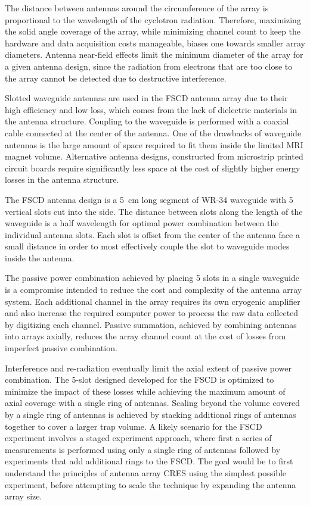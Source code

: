 The distance between antennas around the circumference of the array is proportional to the wavelength of the cyclotron radiation. Therefore, maximizing the solid angle coverage of the array, while minimizing channel count to keep the hardware and data acquisition costs manageable, biases one towards smaller array diameters. Antenna near-field effects limit the minimum diameter of the array for a given antenna design, since the radiation from electrons that are too close to the array cannot be detected due to destructive interference. 

Slotted waveguide antennas are used in the FSCD antenna array due to their high efficiency and low loss, which comes from the lack of dielectric materials in the antenna structure. Coupling to the waveguide is performed with a coaxial cable connected at the center of the antenna. One of the drawbacks of waveguide antennas is the large amount of space required to fit them inside the limited MRI magnet volume. Alternative antenna designs, constructed from microstrip printed circuit boards require significantly less space at the cost of slightly higher energy losses in the antenna structure. 

The FSCD antenna design is a 5~cm long segment of WR-34 waveguide with 5 vertical slots cut into the side. The distance between slots along the length of the waveguide is a half wavelength for optimal power combination between the individual antenna slots. Each slot is offset from the center of the antenna face a small distance in order to most effectively couple the slot to waveguide modes inside the antenna.

The passive power combination achieved by placing 5 slots in a single waveguide is a compromise intended to reduce the cost and complexity of the antenna array system. Each additional channel in the array requires its own cryogenic amplifier and also increase the required computer power to process the raw data collected by digitizing each channel. Passive summation, achieved by combining antennas into arrays axially, reduces the array channel count at the cost of losses from imperfect passive combination.

Interference and re-radiation eventually limit the axial extent of passive power combination. The 5-slot designed developed for the FSCD is optimized to minimize the impact of these losses while achieving the maximum amount of axial coverage with a single ring of antennas. Scaling beyond the volume covered by a single ring of antennas is achieved by stacking additional rings of antennas together to cover a larger trap volume. A likely scenario for the FSCD experiment involves a staged experiment approach, where first a series of measurements is performed using only a single ring of antennas followed by experiments that add additional rings to the FSCD. The goal would be to first understand the principles of antenna array CRES using the simplest possible experiment, before attempting to scale the technique by expanding the antenna array size. 

